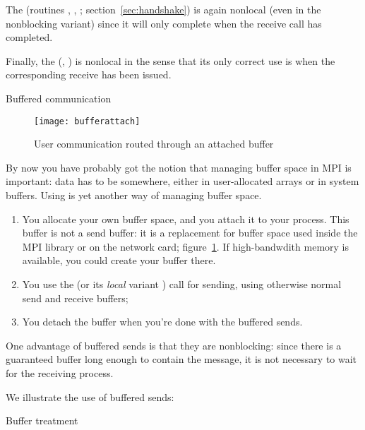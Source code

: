 The  
(routines , ,
; section~\ref{sec:handshake})
is again nonlocal (even in the nonblocking variant)
since it will only complete when the receive call has completed.

Finally, the 
(, )
is nonlocal in the sense that its only correct use
is when the corresponding receive has been issued.


 {Buffered communication}
\label{sec:buffered}

\begin{figure}[ht]
  \texttt{[image: bufferattach]}
  \caption{User communication routed through an attached buffer}
  \label{fig:bufattach}
\end{figure}

By now you have probably got the notion that managing buffer
space in MPI is important: data has to be somewhere, either in
user-allocated arrays or in system buffers. Using
 is yet another
way of managing buffer space.
\begin{enumerate}
\item You allocate your own buffer space, and you attach it to your
  process. This buffer is not a send buffer: it is a replacement for
  buffer space used inside the MPI library or on the network card;
  figure~\ref{fig:bufattach}. If high-bandwdith memory is available,
  you could create your buffer there.
\item You use the 
  (or its \emph{local} variant )
  call for sending, using
  otherwise normal send and receive buffers;
\item You detach the buffer when you're done with the buffered sends.
\end{enumerate}

One advantage of buffered sends is that they are nonblocking:
since there is a guaranteed buffer long enough to contain the
message, it is not necessary to wait for the receiving process.

We illustrate the use of buffered sends:


 {Buffer treatment}


